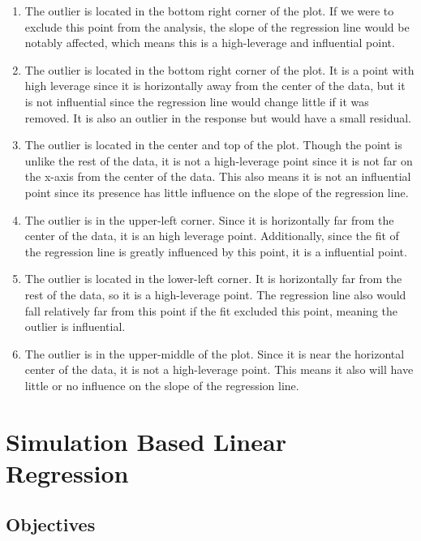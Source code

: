 \documentclass[
]{book}
\providecommand{\tightlist}{%
  \setlength{\itemsep}{0pt}\setlength{\parskip}{0pt}}
\begin{document}
\begin{enumerate}
\def\labelenumi{(\alph{enumi})}
\tightlist
\item
  The outlier is located in the bottom right corner of the plot. If we were to exclude this point from the analysis, the slope of the regression line would be notably affected, which means this is a high-leverage and influential point.\\
\item
  The outlier is located in the bottom right corner of the plot. It is a point with high leverage since it is horizontally away from the center of the data, but it is not influential since the regression line would change little if it was removed. It is also an outlier in the response but would have a small residual.\\
\item
  The outlier is located in the center and top of the plot. Though the point is unlike the rest of the data, it is not a high-leverage point since it is not far on the x-axis from the center of the data. This also means it is not an influential point since its presence has little influence on the slope of the regression line.\\
\item
  The outlier is in the upper-left corner. Since it is horizontally far from the center of the data, it is an high leverage point. Additionally, since the fit of the regression line is greatly influenced by this point, it is a influential point.\\
\item
  The outlier is located in the lower-left corner. It is horizontally far from the rest of the data, so it is a high-leverage point. The regression line also would fall relatively far from this point if the fit excluded this point, meaning the outlier is influential.\\
\item
  The outlier is in the upper-middle of the plot. Since it is near the horizontal center of the data, it is not a high-leverage point. This means it also will have little or no influence on the slope of the regression line.
\end{enumerate}

\hypertarget{LRSIM}{%
\chapter{Simulation Based Linear Regression}\label{LRSIM}}

\hypertarget{objectives-27}{%
\section{Objectives}\label{objectives-27}}
\end{document}
